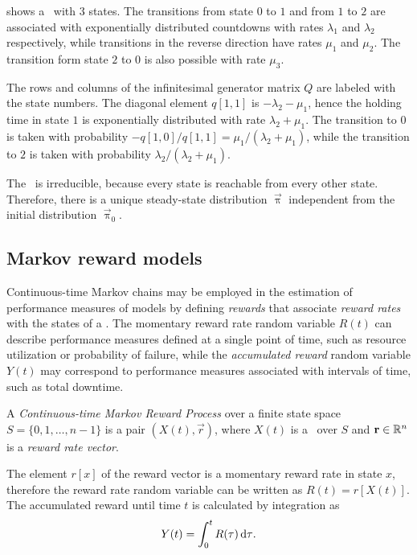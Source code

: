 \begin{example}
   shows a \CTMC\ with $3$
  states. The transitions from state $0$ to $1$ and from $1$ to $2$
  are associated with exponentially distributed countdowns with rates
  $\lambda_1$ and $\lambda_2$ respectively, while transitions in the
  reverse direction have rates $\mu_1$ and $\mu_2$. The transition
  form state $2$ to $0$ is also possible with rate $\mu_3$.
  
  The rows  and
  columns  of the infinitesimal generator
  matrix $Q$ are labeled with the state numbers. The diagonal element
  $q[1, 1]$ is $-\lambda_2 - \mu_1$, hence the holding time in state
  $1$ is exponentially distributed with rate $\lambda_2 + \mu_1$. The
  transition to $0$ is taken with probability
  $-q[1, 0] / q[1, 1] = \mu_1 / (\lambda_2 + \mu_1)$, while the
  transition to $2$ is taken with probability
  $\lambda_2 / (\lambda_2 + \mu_1)$.

  The \CTMC\ is irreducible, because every state is reachable from
  every other state. Therefore, there is a unique steady-state
  distribution $\vec{\uppi}$ independent from the initial distribution
  $\vec{\uppi}_0$.
\end{example}

\subsection{Markov reward models}

Continuous-time Markov chains may be employed in the estimation of
performance measures of models by defining \emph{rewards} that
associate \emph{reward rates} with the states of a \CTMC. The
momentary reward rate random variable $R(t)$ can describe performance
measures defined at a single point of time, such as resource
utilization or probability of failure, while the \emph{accumulated
  reward} random variable $Y(t)$ may correspond to performance
measures associated with intervals of time, such as total downtime.

\begin{dfn}
  A \emph{Continuous-time Markov Reward Process} over a finite state
  space $S = \{0, 1, \ldots, n - 1\}$ is a pair $(X(t), \vec{r})$,
  where $X(t)$ is a \CTMC\ over $S$ and $\bm{\mathrm{r}} \in \mathbb{R}^n$ is a
  \emph{reward rate vector}.
\end{dfn}

The element $r[x]$ of the reward vector is a momentary reward rate in
state $x$, therefore the reward rate random variable can be written as
$R(t) = r[X(t)]$. The accumulated reward until time $t$ is calculated
by integration as
\begin{equation}
  Y(t) = \int_{0}^t R(\tau) \, \mathrm{d} \tau \text.
\end{equation}

